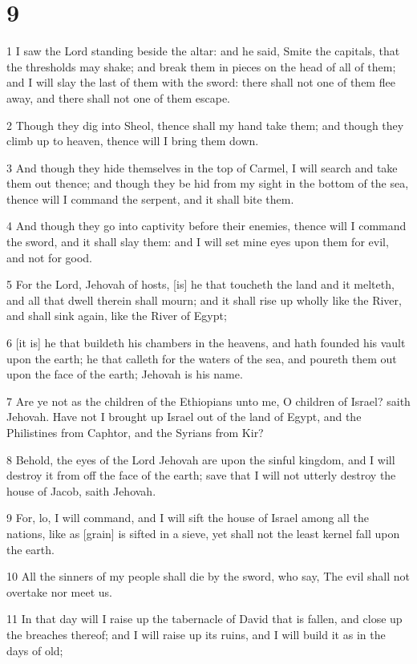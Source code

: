\chapter{9}

\par 1 I saw the Lord standing beside the altar: and he said, Smite the capitals, that the thresholds may shake; and break them in pieces on the head of all of them; and I will slay the last of them with the sword: there shall not one of them flee away, and there shall not one of them escape.
\par 2 Though they dig into Sheol, thence shall my hand take them; and though they climb up to heaven, thence will I bring them down.
\par 3 And though they hide themselves in the top of Carmel, I will search and take them out thence; and though they be hid from my sight in the bottom of the sea, thence will I command the serpent, and it shall bite them.
\par 4 And though they go into captivity before their enemies, thence will I command the sword, and it shall slay them: and I will set mine eyes upon them for evil, and not for good.
\par 5 For the Lord, Jehovah of hosts, [is] he that toucheth the land and it melteth, and all that dwell therein shall mourn; and it shall rise up wholly like the River, and shall sink again, like the River of Egypt;
\par 6 [it is] he that buildeth his chambers in the heavens, and hath founded his vault upon the earth; he that calleth for the waters of the sea, and poureth them out upon the face of the earth; Jehovah is his name.
\par 7 Are ye not as the children of the Ethiopians unto me, O children of Israel? saith Jehovah. Have not I brought up Israel out of the land of Egypt, and the Philistines from Caphtor, and the Syrians from Kir?
\par 8 Behold, the eyes of the Lord Jehovah are upon the sinful kingdom, and I will destroy it from off the face of the earth; save that I will not utterly destroy the house of Jacob, saith Jehovah.
\par 9 For, lo, I will command, and I will sift the house of Israel among all the nations, like as [grain] is sifted in a sieve, yet shall not the least kernel fall upon the earth.
\par 10 All the sinners of my people shall die by the sword, who say, The evil shall not overtake nor meet us.
\par 11 In that day will I raise up the tabernacle of David that is fallen, and close up the breaches thereof; and I will raise up its ruins, and I will build it as in the days of old;
